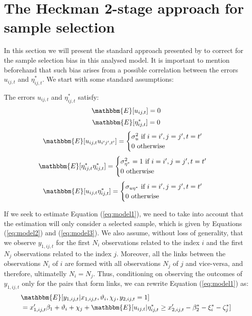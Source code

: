 \section{The Heckman 2-stage approach for sample selection} \label{section_heckman}
In this section we will present the standard approach presented by \cite{heckman1979sample} to correct for the sample selection bias in this analysed model. It is important to mention beforehand that such bias arises from a possible correlation between the errors $u_{ij,t}$ and $\eta^*_{ij,t}$. We start with some standard assumptions:
\begin{assumption} \label{assumption_heckman_1}
    The errors $u_{ij,t}$ and $\eta^*_{i j,t}$ satisfy: \\
    $$\mathbbm{E}[u_{ij,t}] = 0$$
    $$\mathbbm{E}[\eta^*_{i j,t}] = 0$$
    $$\mathbbm{E}[u_{ij,t} u_{i'j',t'}] = \begin{cases}
        \sigma_u^2 \text{ if } i=i', j=j', t=t'\\
        0 \text{ otherwise}\\
        \end{cases}$$
    $$\mathbbm{E}[\eta_{ij,t}^* {\eta_{ij,t}^*}] = 
    \begin{cases}
        \sigma_{\eta^*}^2 = 1 \text{ if } i=i', j=j', t=t'\\
        0 \text{ otherwise}\\
        \end{cases}$$
    $$\mathbbm{E}[u_{ij,t} {\eta_{ij,t}^*}] = 
    \begin{cases}
        \sigma_{u\eta^*} \text{ if } i=i', j=j', t=t'\\
        0 \text{ otherwise}\\
        \end{cases}$$
\end{assumption}

If we seek to estimate Equation (\ref{eq:model1}), we need to take into account that the estimation will only consider a selected sample, which is given by Equations (\ref{eq:model2}) and (\ref{eq:model3}). We also assume, without loss of generality, that we observe $y_{1,ij,t}$ for the first $N_i$ observations related to the index $i$ and the first $N_j$ observations related to the index $j$. Moreover, all the links between the observations $N_i$ of $i$ are formed with all observations $N_j$ of $j$ and vice-versa, and therefore, ultimatelly $N_i = N_j$. Thus, conditioning on observing the outcomes of $y_{1,ij,t}$ only for the pairs that form links, we can rewrite Equation (\ref{eq:model1}) as:
\begin{align} \label{eq:heckman1}
    &\mathbbm{E}[y_{1,ij,t} \rvert x_{1,ij,t}, \vartheta_i, \chi_j, y_{2,i j,t}= 1] \\ 
    &=  x_{1,ij,t}'\beta_1 + \vartheta_i + \chi_j + \mathbbm{E} [u_{ij,t} \rvert \eta^*_{i j,t} \geq x_{2,ij,t}'-{\beta_2^*}  -\xi_{i}^*-\zeta_{j}^*] \nonumber
\end{align}

